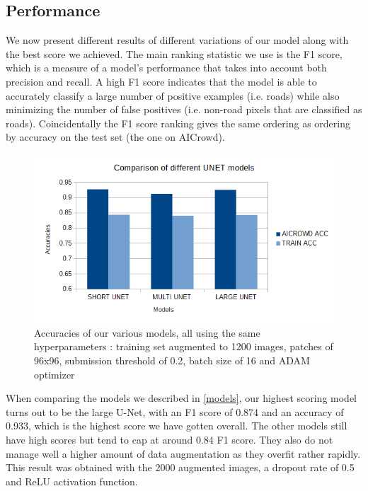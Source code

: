 \documentclass[10pt,conference,compsocconf]{IEEEtran}
\begin{document}
\subsection{Performance}
We now present different results of different variations of our model along with the best score we achieved. The main ranking statistic we use is the F1 score, which is a measure of a model's performance that takes into account both precision and recall. A high F1 score indicates that the model is able to accurately classify a large number of positive examples (i.e. roads) while also minimizing the number of false positives (i.e. non-road pixels that are classified as roads). Coincidentally the F1 score ranking gives the same ordering as ordering by accuracy on the test set (the one on AICrowd).
\vspace{-0.2in}
\begin{figure}[H]
    \centering
    \includegraphics[scale = 0.4]{report_images/models_graph.png} %
    \vspace{-0.1in}
    \caption{Accuracies of our various models, all using the same hyperparameters : training set augmented to 1200 images, patches of 96x96, submission threshold of 0.2, batch size of 16 and ADAM optimizer}
\end{figure}
\vspace{-0.1in}
When comparing the models we described in \ref{models}, our highest scoring model turns out to be the large U-Net, with an F1 score of 0.874 and an accuracy of 0.933, which is the highest score we have gotten overall. The other models still have high scores but tend to cap at around 0.84 F1 score. They also do not manage well a higher amount of data augmentation as they overfit rather rapidly. This result was obtained with the 2000 augmented images, a dropout rate of 0.5 and ReLU activation function.
\end{document}
